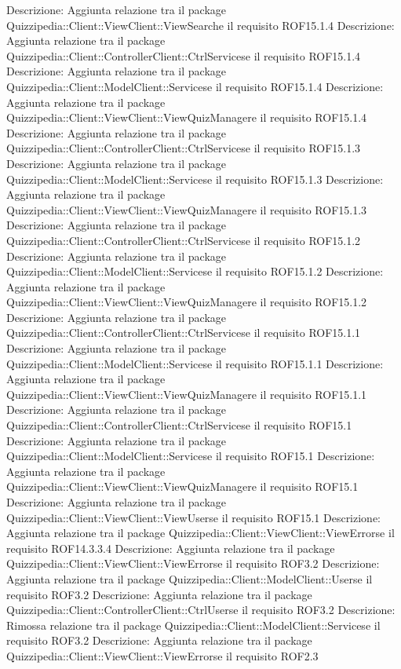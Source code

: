 Descrizione: Aggiunta relazione tra il package Quizzipedia::Client::ViewClient::ViewSearche il requisito ROF15.1.4 
Descrizione: Aggiunta relazione tra il package Quizzipedia::Client::ControllerClient::CtrlServicese il requisito ROF15.1.4 
Descrizione: Aggiunta relazione tra il package Quizzipedia::Client::ModelClient::Servicese il requisito ROF15.1.4 
Descrizione: Aggiunta relazione tra il package Quizzipedia::Client::ViewClient::ViewQuizManagere il requisito ROF15.1.4 
Descrizione: Aggiunta relazione tra il package Quizzipedia::Client::ControllerClient::CtrlServicese il requisito ROF15.1.3 
Descrizione: Aggiunta relazione tra il package Quizzipedia::Client::ModelClient::Servicese il requisito ROF15.1.3 
Descrizione: Aggiunta relazione tra il package Quizzipedia::Client::ViewClient::ViewQuizManagere il requisito ROF15.1.3 
Descrizione: Aggiunta relazione tra il package Quizzipedia::Client::ControllerClient::CtrlServicese il requisito ROF15.1.2 
Descrizione: Aggiunta relazione tra il package Quizzipedia::Client::ModelClient::Servicese il requisito ROF15.1.2 
Descrizione: Aggiunta relazione tra il package Quizzipedia::Client::ViewClient::ViewQuizManagere il requisito ROF15.1.2 
Descrizione: Aggiunta relazione tra il package Quizzipedia::Client::ControllerClient::CtrlServicese il requisito ROF15.1.1 
Descrizione: Aggiunta relazione tra il package Quizzipedia::Client::ModelClient::Servicese il requisito ROF15.1.1 
Descrizione: Aggiunta relazione tra il package Quizzipedia::Client::ViewClient::ViewQuizManagere il requisito ROF15.1.1 
Descrizione: Aggiunta relazione tra il package Quizzipedia::Client::ControllerClient::CtrlServicese il requisito ROF15.1 
Descrizione: Aggiunta relazione tra il package Quizzipedia::Client::ModelClient::Servicese il requisito ROF15.1 
Descrizione: Aggiunta relazione tra il package Quizzipedia::Client::ViewClient::ViewQuizManagere il requisito ROF15.1 
Descrizione: Aggiunta relazione tra il package Quizzipedia::Client::ViewClient::ViewUserse il requisito ROF15.1 
Descrizione: Aggiunta relazione tra il package Quizzipedia::Client::ViewClient::ViewErrorse il requisito ROF14.3.3.4 
Descrizione: Aggiunta relazione tra il package Quizzipedia::Client::ViewClient::ViewErrorse il requisito ROF3.2 
Descrizione: Aggiunta relazione tra il package Quizzipedia::Client::ModelClient::Userse il requisito ROF3.2 
Descrizione: Aggiunta relazione tra il package Quizzipedia::Client::ControllerClient::CtrlUserse il requisito ROF3.2 
Descrizione: Rimossa relazione tra il package Quizzipedia::Client::ModelClient::Servicese il requisito ROF3.2 
Descrizione: Aggiunta relazione tra il package Quizzipedia::Client::ViewClient::ViewErrorse il requisito ROF2.3 
